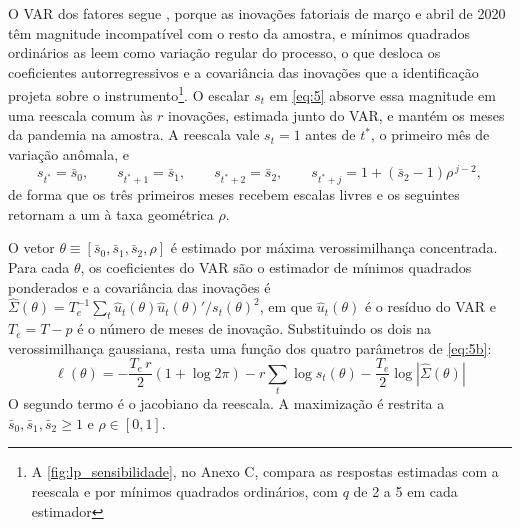 \documentclass[preprint,authoryear,review,12pt]{elsarticle}
\begin{document}
O VAR dos fatores segue \cite{lenzaprimiceri}, porque as inovações fatoriais de março e abril de 2020 têm magnitude incompatível com o resto da amostra, e mínimos quadrados ordinários as leem como variação regular do processo, o que desloca os coeficientes autorregressivos e a covariância das inovações que a identificação projeta sobre o instrumento\footnote{A \autoref{fig:lp_sensibilidade}, no Anexo C, compara as respostas estimadas com a reescala e por mínimos quadrados ordinários, com $q$ de 2 a 5 em cada estimador}. O escalar $s_t$ em \ref{eq:5} absorve essa magnitude em uma reescala comum às $r$ inovações, estimada junto do VAR, e mantém os meses da pandemia na amostra. A reescala vale $s_t = 1$ antes de $t^*$, o primeiro mês de variação anômala, e
\begin{equation}\label{eq:5b}
    s_{t^*} = \bar{s}_0, \qquad s_{t^*+1} = \bar{s}_1, \qquad s_{t^*+2} = \bar{s}_2, \qquad s_{t^*+j} = 1 + (\bar{s}_2 - 1)\rho^{\,j-2},
\end{equation}
de forma que os três primeiros meses recebem escalas livres e os seguintes retornam a um à taxa geométrica $\rho$.

O vetor $\theta \equiv [\bar{s}_0, \bar{s}_1, \bar{s}_2, \rho]$ é estimado por máxima verossimilhança concentrada. Para cada $\theta$, os coeficientes do VAR são o estimador de mínimos quadrados ponderados e a covariância das inovações é $\hat{\Sigma}(\theta) = T_e^{-1}\sum_t \hat{u}_t(\theta)\hat{u}_t(\theta)'/s_t(\theta)^2$, em que $\hat{u}_t(\theta)$ é o resíduo do VAR e $T_e = T - p$ é o número de meses de inovação. Substituindo os dois na verossimilhança gaussiana, resta uma função dos quatro parâmetros de \ref{eq:5b}:
\begin{equation}\label{eq:5c}
    \ell(\theta) = -\frac{T_e\,r}{2}\left(1 + \log 2\pi\right) - r\sum_{t} \log s_t(\theta) - \frac{T_e}{2}\log\left|\hat{\Sigma}(\theta)\right|
\end{equation}
O segundo termo é o jacobiano da reescala. A maximização é restrita a $\bar{s}_0, \bar{s}_1, \bar{s}_2 \geq 1$ e $\rho \in [0, 1]$.

\end{document}
